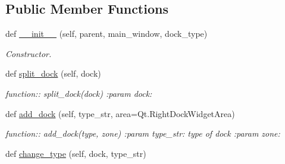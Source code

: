 \subsection*{Public Member Functions}
\begin{DoxyCompactItemize}
\item 
def \hyperlink{classplume-creator_1_1src_1_1plume_1_1gui_1_1docks_1_1_dock_system_a9fd9a7b2f0e382f75cd10085b0a0f2b1}{\+\_\+\+\_\+init\+\_\+\+\_\+} (self, parent, main\+\_\+window, dock\+\_\+type)\hypertarget{classplume-creator_1_1src_1_1plume_1_1gui_1_1docks_1_1_dock_system_a9fd9a7b2f0e382f75cd10085b0a0f2b1}{}\label{classplume-creator_1_1src_1_1plume_1_1gui_1_1docks_1_1_dock_system_a9fd9a7b2f0e382f75cd10085b0a0f2b1}

\begin{DoxyCompactList}\small\item\em Constructor. \end{DoxyCompactList}\item 
def \hyperlink{classplume-creator_1_1src_1_1plume_1_1gui_1_1docks_1_1_dock_system_afa6cdf7a17578a0844fb21579ffd7942}{split\+\_\+dock} (self, dock)\hypertarget{classplume-creator_1_1src_1_1plume_1_1gui_1_1docks_1_1_dock_system_afa6cdf7a17578a0844fb21579ffd7942}{}\label{classplume-creator_1_1src_1_1plume_1_1gui_1_1docks_1_1_dock_system_afa6cdf7a17578a0844fb21579ffd7942}

\begin{DoxyCompactList}\small\item\em function\+:\+: split\+\_\+dock(dock) \+:param dock\+: \end{DoxyCompactList}\item 
def \hyperlink{classplume-creator_1_1src_1_1plume_1_1gui_1_1docks_1_1_dock_system_a2a032d1e563daff4f363b7a6a0be0ddb}{add\+\_\+dock} (self, type\+\_\+str, area=Qt.\+Right\+Dock\+Widget\+Area)\hypertarget{classplume-creator_1_1src_1_1plume_1_1gui_1_1docks_1_1_dock_system_a2a032d1e563daff4f363b7a6a0be0ddb}{}\label{classplume-creator_1_1src_1_1plume_1_1gui_1_1docks_1_1_dock_system_a2a032d1e563daff4f363b7a6a0be0ddb}

\begin{DoxyCompactList}\small\item\em function\+:\+: add\+\_\+dock(type, zone) \+:param type\+\_\+str\+: type of dock \+:param zone\+: \end{DoxyCompactList}\item 
def \hyperlink{classplume-creator_1_1src_1_1plume_1_1gui_1_1docks_1_1_dock_system_a3075676277bd8ea6add670632f1196bb}{change\+\_\+type} (self, dock, type\+\_\+str)\hypertarget{classplume-creator_1_1src_1_1plume_1_1gui_1_1docks_1_1_dock_system_a3075676277bd8ea6add670632f1196bb}{}\label{classplume-creator_1_1src_1_1plume_1_1gui_1_1docks_1_1_dock_system_a3075676277bd8ea6add670632f1196bb}


\end{DoxyCompactItemize}

